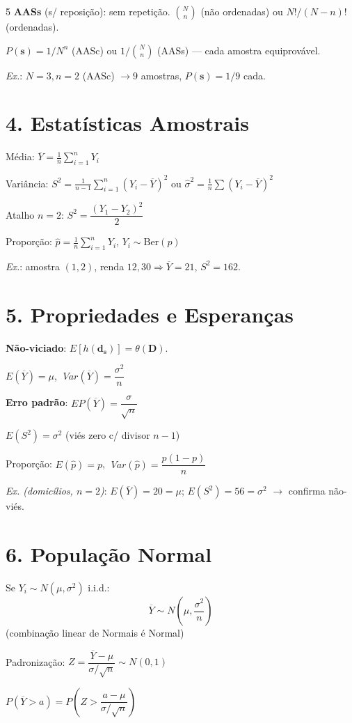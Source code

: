 \documentclass[7pt,landscape,a4paper]{extarticle}
\begin{document}
\begin{multicols*}{5}
\textbf{AASs} (s/ reposição): sem repetição. $\binom{N}{n}$ (não ordenadas) ou $N!/(N-n)!$ (ordenadas).

$P(\mathbf{s})=1/N^n$ (AASc) ou $1/\binom{N}{n}$ (AASs) — cada amostra equiprovável.

\textit{Ex.}: $N=3,n=2$ (AASc) $\to 9$ amostras, $P(\mathbf s)=1/9$ cada.

\section{4. Estatísticas Amostrais}
Média: $\overline{Y}=\frac{1}{n}\sum_{i=1}^n Y_i$

Variância: $S^2=\frac{1}{n-1}\sum_{i=1}^n (Y_i-\overline{Y})^2$ ou $\hat\sigma^2=\frac{1}{n}\sum(Y_i-\overline{Y})^2$

Atalho $n=2$: $S^2=\dfrac{(Y_1-Y_2)^2}{2}$

Proporção: $\hat p=\frac{1}{n}\sum_{i=1}^n Y_i$, $Y_i\sim\text{Ber}(p)$

\textit{Ex.}: amostra $(1,2)$, renda $12,30\Rightarrow \overline Y=21$, $S^2=162$.

\section{5. Propriedades e Esperanças}
\textbf{Não-viciado}: $E[h(\mathbf{d_s})]=\theta(\mathbf{D})$.

$E(\overline{Y})=\mu$, $\;Var(\overline{Y})=\dfrac{\sigma^2}{n}$

\textbf{Erro padrão}: $EP(\overline{Y})=\dfrac{\sigma}{\sqrt n}$

$E(S^2)=\sigma^2$ (viés zero c/ divisor $n{-}1$)

Proporção: $E(\hat p)=p$, $\;Var(\hat p)=\dfrac{p(1-p)}{n}$

\textit{Ex. (domicílios, $n=2$)}: $E(\overline{Y})=20=\mu$; $E(S^2)=56=\sigma^2$ $\to$ confirma não-viés.

\columnbreak

\section{6. População Normal}
Se $Y_i\sim N(\mu,\sigma^2)$ i.i.d.:
$$\overline{Y}\sim N\!\left(\mu,\frac{\sigma^2}{n}\right)$$
(combinação linear de Normais é Normal)

Padronização: $Z=\dfrac{\overline{Y}-\mu}{\sigma/\sqrt n}\sim N(0,1)$

$P(\overline{Y}>a)=P\!\left(Z>\dfrac{a-\mu}{\sigma/\sqrt n}\right)$


\end{multicols*}
\end{document}
